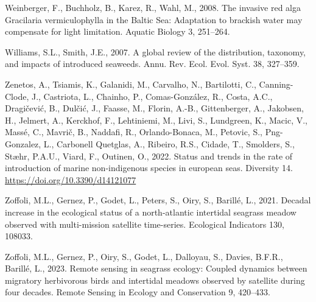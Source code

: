 \documentclass[
  letterpaper,
  DIV=11,
  numbers=noendperiod]{scrartcl}
\newlength{\cslhangindent}
\newenvironment{CSLReferences}[2] %
 {\begin{list}{}{%
  \setlength{\itemindent}{0pt}
  \setlength{\leftmargin}{0pt}
  \setlength{\parsep}{0pt}
  \ifodd #1
   \setlength{\leftmargin}{\cslhangindent}
   \setlength{\itemindent}{-1\cslhangindent}
  \fi
  \setlength{\itemsep}{#2\baselineskip}}}
 {\end{list}}
\begin{document}
\begin{CSLReferences}{1}{0}
Weinberger, F., Buchholz, B., Karez, R., Wahl, M., 2008. The invasive
red alga {G}racilaria vermiculophylla in the {B}altic {S}ea: Adaptation
to brackish water may compensate for light limitation. Aquatic Biology
3, 251--264.

Williams, S.L., Smith, J.E., 2007. A global review of the distribution,
taxonomy, and impacts of introduced seaweeds. Annu. Rev. Ecol. Evol.
Syst. 38, 327--359.

Zenetos, A., Tsiamis, K., Galanidi, M., Carvalho, N., Bartilotti, C.,
Canning-Clode, J., Castriota, L., Chainho, P., Comas-González, R.,
Costa, A.C., Dragičević, B., Dulčić, J., Faasse, M., Florin, A.-B.,
Gittenberger, A., Jakobsen, H., Jelmert, A., Kerckhof, F., Lehtiniemi,
M., Livi, S., Lundgreen, K., Macic, V., Massé, C., Mavrič, B., Naddafi,
R., Orlando-Bonaca, M., Petovic, S., Png-Gonzalez, L., Carbonell
Quetglas, A., Ribeiro, R.S., Cidade, T., Smolders, S., Stæhr, P.A.U.,
Viard, F., Outinen, O., 2022. Status and trends in the rate of
introduction of marine non-indigenous species in european seas.
Diversity 14. \url{https://doi.org/10.3390/d14121077}

Zoffoli, M.L., Gernez, P., Godet, L., Peters, S., Oiry, S., Barillé, L.,
2021. Decadal increase in the ecological status of a north-atlantic
intertidal seagrass meadow observed with multi-mission satellite
time-series. Ecological Indicators 130, 108033.

Zoffoli, M.L., Gernez, P., Oiry, S., Godet, L., Dalloyau, S., Davies,
B.F.R., Barillé, L., 2023. Remote sensing in seagrass ecology: Coupled
dynamics between migratory herbivorous birds and intertidal meadows
observed by satellite during four decades. Remote Sensing in Ecology and
Conservation 9, 420--433.

\end{CSLReferences}
\end{document}
